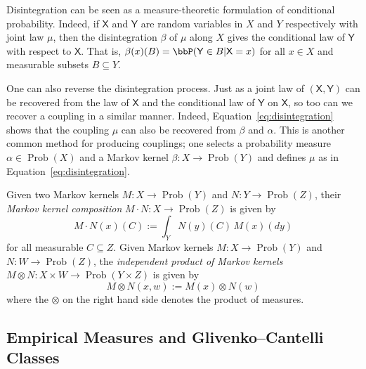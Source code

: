 \documentclass[twoside,11pt]{article}
\DeclareMathOperator{\prob}{Prob}
\begin{document}
Disintegration can be seen as a measure-theoretic formulation of conditional probability. Indeed, if $\mathsf X$ and $\mathsf Y$ are random variables in $X$ and $Y$ respectively with joint law $\mu$, then the disintegration $\beta$ of $\mu$ along $X$ gives the conditional law of $\mathsf Y$ with respect to $\mathsf X$. That is, $\beta(x)(B) = \bbP(\mathsf Y \in B|\mathsf X =x)$ for all $x\in X$ and measurable subsets $B\subseteq Y$.

One can also reverse the disintegration process. Just as a joint law of $(\mathsf X,\mathsf Y)$ can be recovered from the law of $\mathsf X$ and the conditional law of $\mathsf Y$ on $\mathsf X$, so too can we recover a coupling in a similar manner. Indeed, Equation~\eqref{eq:disintegration} shows that the coupling $\mu$ can also be recovered from $\beta$ and $\alpha$. This is another common method for producing couplings; one selects a probability measure $\alpha \in \prob(X)$ and a Markov kernel $\beta:X\to \prob(Y)$ and defines $\mu$ as in Equation~\eqref{eq:disintegration}.

Given two Markov kernels $M:X\to \prob(Y)$ and $N:Y\to \prob(Z)$, their \emph{Markov kernel composition} $M\cdot N:X\to \prob(Z)$ is given by
\[M\cdot N(x)(C) := \int_Y N(y)(C)\, M(x)(dy)\]
for all measurable $C\subseteq Z$.
Given Markov kernels $M:X\to \prob(Y)$ and $N:W\to \prob(Z)$, the \emph{independent product of Markov kernels} $M\otimes N:X\times W \to \prob(Y\times Z)$ is given by
\[M\otimes N(x,w) := M(x) \otimes N(w)\]
where the $\otimes$ on the right hand side denotes the product of measures.

\subsection{Empirical Measures and Glivenko–Cantelli Classes}\label{subsec:GC}
\end{document}
